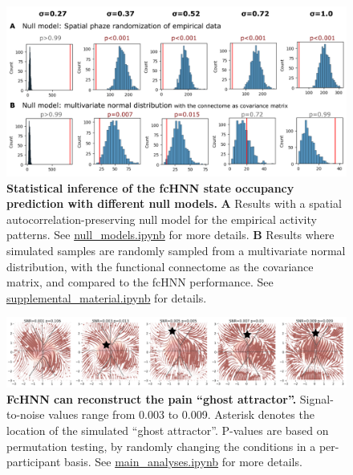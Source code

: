 \documentclass{article}
\begin{document}
\begin{figure}[!htbp]
\centering
\includegraphics[width=0.7\linewidth]{files/si_state_occupancy_n-000f215b531db14f754b6fe4a2280584.png}
\caption[]{\textbf{Statistical inference of the fcHNN state occupancy prediction with different null models.}
\textbf{A} Results with a spatial autocorrelation-preserving null model for the empirical activity patterns. See \href{https://github.com/pni-lab/connattractor/blob/master/notebooks/null\_models.ipynb}{null\_models.ipynb} for more details.
\textbf{B} Results where simulated samples are randomly sampled from a multivariate normal distribution, with the functional connectome as the covariance matrix, and compared to the fcHNN performance. See \href{https://github.com/pni-lab/connattractor/blob/master/notebooks/supplemental\_material.ipynb}{supplemental\_material.ipynb} for details.}
\label{si_state_occupancy_null_models}
\end{figure}

\begin{figure}[!htbp]
\centering
\includegraphics[width=0.7\linewidth]{files/si_pain_ghost_attrac-fb6e568adc390b51b90bd3e362475eab.png}
\caption[]{\textbf{FcHNN can reconstruct the pain ``ghost attractor''.}
Signal-to-noise values range from 0.003 to 0.009. Asterisk denotes the location of the simulated ``ghost attractor''. P-values are based on permutation testing, by randomly changing the conditions in a per-participant basis. See \href{https://github.com/pni-lab/connattractor/blob/master/notebooks/main\_analyses.ipynb}{main\_analyses.ipynb} for more details.}
\label{si_pain_ghost_attractor_sim}
\end{figure}
\end{document}

